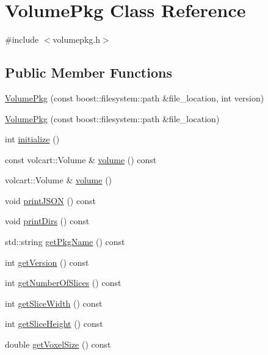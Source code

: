 \hypertarget{classVolumePkg}{}\section{Volume\+Pkg Class Reference}
\label{classVolumePkg}


{\ttfamily \#include $<$volumepkg.\+h$>$}

\subsection*{Public Member Functions}
\begin{DoxyCompactItemize}
\item 
\hyperlink{classVolumePkg_a744e1956dc2a4110b67cc088b2a0a871}{Volume\+Pkg} (const boost\+::filesystem\+::path \&file\+\_\+location, int version)
\item 
\hyperlink{classVolumePkg_a901f84ed2afd19ca64d4052e55340bb5}{Volume\+Pkg} (const boost\+::filesystem\+::path \&file\+\_\+location)
\item 
int \hyperlink{classVolumePkg_a1136333d9a9c3f8914cdb547336c586b}{initialize} ()
\item 
const volcart\+::\+Volume \& \hyperlink{classVolumePkg_af346c954f18704b60f4b518412d5b0b0}{volume} () const
\item 
volcart\+::\+Volume \& \hyperlink{classVolumePkg_a49a10fff903e76fe8fbd72793621eaa2}{volume} ()
\item 
void \hyperlink{classVolumePkg_ab4c4d6cb9715dbdde2e76f96115d94f9}{print\+J\+S\+ON} () const
\item 
void \hyperlink{classVolumePkg_a3489e485f40be9bdcb4b993b6aaccc2d}{print\+Dirs} () const
\item 
std\+::string \hyperlink{classVolumePkg_a3c9253427cf985c1bd523d84c396677b}{get\+Pkg\+Name} () const
\item 
int \hyperlink{classVolumePkg_a2a0e7f720aab28e7c67e22fc37051c0c}{get\+Version} () const
\item 
int \hyperlink{classVolumePkg_a918b84ee059538166553c949188a8fd9}{get\+Number\+Of\+Slices} () const
\item 
int \hyperlink{classVolumePkg_a428f50ef3408fbc8826597d1dcb35ed5}{get\+Slice\+Width} () const
\item 
int \hyperlink{classVolumePkg_a28bc3bf24aa05a6c802888a3fb862aec}{get\+Slice\+Height} () const
\item 
double \hyperlink{classVolumePkg_a0fb419c7902913a8b98fb5aafb90685e}{get\+Voxel\+Size} () const
\item 

\end{DoxyCompactItemize}
